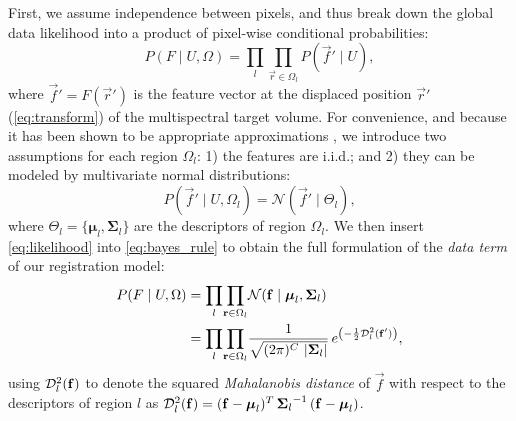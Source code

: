 First, we assume independence between pixels, and thus break down the
  global data likelihood into a product of pixel-wise conditional probabilities:
  \begin{equation}
  P(F \mid U,\Omega) = \underset{l}{\prod} \underset{\vec{r}\in \Omega_l}{\prod}
    P\left( \vec{f}' \mid U \right),
  \label{eq:bayes_aposteriori}
  \end{equation}
  where $\vec{f}' = F(\vec{r}')$ is the feature vector at the displaced
  position $\vec{r}'$ (\autoref{eq:transform}) of the multispectral target
  volume.
For convenience, and because it has been shown to be appropriate approximations
  \citep{cuadra_comparison_2005}, we introduce two assumptions for each
  region $\Omega_l$:
  1) the features are i.i.d.; and 2) they can be modeled by multivariate normal
  distributions:
  \begin{equation}
  P\left( \vec{f}' \mid U,\Omega_l \right) = \mathcal{N} \left( \vec{f}' \mid \Theta_l \right),
  \label{eq:likelihood}
  \end{equation}
 	where $\Theta_l = \lbrace \boldsymbol{\mu}_l, \boldsymbol{\Sigma}_{l} \rbrace$ are the
 	descriptors of region $\Omega_l$.
We then insert \autoref{eq:likelihood} into \autoref{eq:bayes_rule} to obtain the full
  formulation of the \emph{data term} of our registration model:
 	\begin{align}
  P( F \mid U, \Omega ) &= \underset{l}{\prod} \underset{\vec{r} \in \Omega_l}{\prod}
  \mathcal{N} ( \vec{f} \mid \boldsymbol{\mu}_l, \boldsymbol{\Sigma}_{l} ) \notag\\
  &= \underset{l}{\prod} \underset{\vec{r} \in \Omega_l}{\prod} \frac{1}{ \sqrt{(2\pi)^{C}\,\left|\boldsymbol{\Sigma}_{l}\right|}}\,{e^{\left(-\frac{1}{2}
  \mdist{f'}{l} \right)}},
  \label{eq:pdf}
  \end{align}
  using $\mdist{f}{l}$ to denote the squared \emph{Mahalanobis distance} of $\vec{f}$ with respect
  to the descriptors of region $l$ as
  $\mdist{f}{l} = (\vec{f} - \boldsymbol{\mu}_l)^T \, {\boldsymbol{\Sigma}_l}^{-1} \, (\vec{f} - \boldsymbol{\mu}_l)$.


